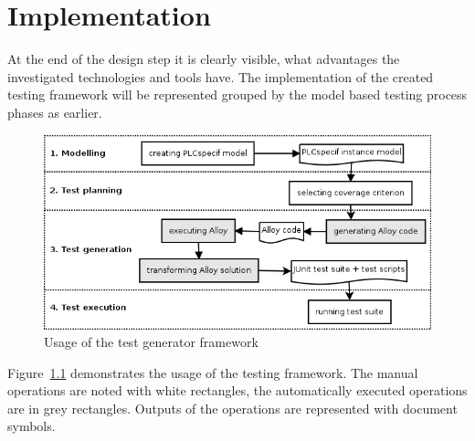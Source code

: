 \chapter{Implementation}
\label{cha:implementation}

At the end of the design step it is clearly visible, what advantages the investigated technologies and tools have. The implementation of the created testing framework will be represented grouped by the model based testing process phases as earlier.

\begin{figure}[htp]
\centering
\includegraphics[scale=0.6]{figures/implementation_usage}
\caption{Usage of the test generator framework}
\label{fig:implementation_usage}
\end{figure}

Figure~\ref{fig:implementation_usage} demonstrates the usage of the testing framework. The manual operations are noted with white rectangles, the automatically executed operations are in grey rectangles. Outputs of the operations are represented with document symbols.

